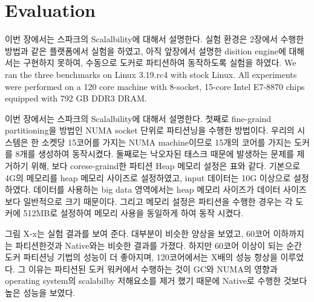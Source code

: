 \section{Evaluation}


\ifkor
이번 장에서는 스파크의 Scalalbility에 대해서 설명한다. 
실험 환경은 2장에서 수행한 방법과 같은 플랫폼에서 실험을 하였고,
아직 앞장에서 설명한 disition engine에 대해서는 구현하지 못하여,
 수동으로 도커로 파티션하여 동작하도록 실험을 하였다. 
We ran the three benchmarks on Linux 3.19.rc4 with stock Linux. 
All experiments were performed on a 120 core machine with 8-socket, 15-core
Intel E7-8870 chips equipped with 792 GB DDR3 DRAM.
\else

\fi




\ifkor
이번 장에서는 스파크의 Scalalbility에 대해서 설명한다. 첫째로 
fine-graind partitioning을 방법인 NUMA socket 단위로 파티션닝을 수행한 방법이다.
우리의 시스템은 한 소켓당 15코어를 가지는 NUMA machine이므로 15개의 코어를 가지는 도커를 8개를 생성하여 동작시켰다.
둘째로는 낙오자된 태스크 때문에 발생하는 문제를 제거하기 위해, 보다 corese-graind한
파티션 Heap 메모리 설정은 표와 같다. 기본으로 4G의 메모리를 heap 메모리 사이즈로 설정하였고,
input 데이터는 10G 이상으로 설정하였다.
데이터를 사용하는 big data 영역에서는 heap 메모리 사이즈가 데이터 사이즈보다 일반적으로 크기 때문이다.
그리고 메모리 설정은 파티션을 수행한 경우는 각 도커에 512MB로 설정하여 메모리 사용을 
동일하게 하여 동작 시켰다. 
\else

\fi


\ifkor
그림 X-x는 실험 결과를 보여 준다. 대부분이 비슷한 양상을 보였고, 60코어 이하까지는
파티션한것과 Native와는 비슷한 결과를 가졌다. 하지만 60코어 이상이 되는 순간
도커 파티션닝 기법의 성능이 더 좋아지며, 120코어에서는 X배의 성능 항상을 이루었다.
그 이유는 파티션된 도커 워커에서 수행하는 것이 GC와 
NUMA의 영향과 operating system의 scalabilby 저해요소를 제거 했기 때문에 
Native로 수행한 것보다 높은 성능을 보였다. 
\else 

